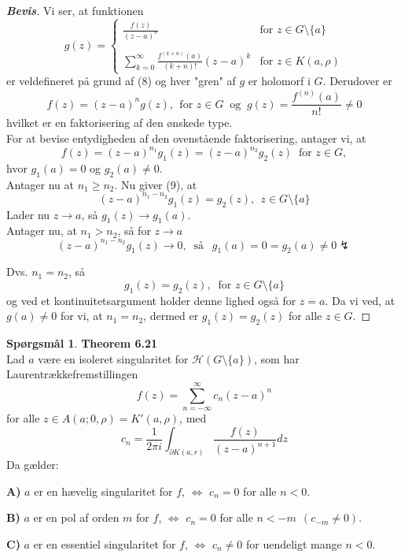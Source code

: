 \documentclass[10pt,a4paper]{article}
\theoremstyle{definition}
\newtheorem{Prob}{Spørgsmål}
\begin{document}
\begin{proof}[\textbf{Bevis}]
Vi ser, at funktionen
$$g(z) =
\left\{
	\begin{array}{ll}
		\frac{f(z)}{(z-a)^n} & \text{for } z \in G \setminus \{a\}\\ \\
		\sum\limits_{k=0}^\infty \frac{f^{(k+n)}(a)}{(k+n)!}(z-a)^k & \text{for } z \in K(a,\rho)
	\end{array}
\right.$$
er veldefineret på grund af (8) og hver "gren" af $g$ er holomorf i $G$. Derudover er
$$ f(z) = (z-a)^n g(z), \ \ \text{for } z \in G \ \text{ og } \ 
g(z) = \frac{f^{(n)}(a)}{n!} \neq 0$$
hvilket er en faktorisering af den ønskede type. \\

For at bevise entydigheden af den ovenstående faktorisering, antager vi, at
\begin{equation}
f(z) = (z-a)^{n_1} g_1(z) = (z-a)^{n_2} g_2(z) \ \text{ for } z \in G,
\end{equation}
hvor $g_1(a) = 0$ og $g_2(a) \neq 0$. \\
Antager nu at $n_1 \geq n_2$. Nu giver (9), at
$$(z-a)^{n_1 - n_2}g_1(z) = g_2(z), \ \ z \in G \setminus \{a\}$$
Lader nu $z \rightarrow a$, så $g_1(z) \rightarrow g_1(a)$. \\
Antager nu, at $n_1 > n_2$, så for $z \rightarrow a$
$$(z-a)^{n_1 - n_2} g_1(z) \rightarrow 0, \ \text{ så } \ \
g_1(a) =0 = g_2(a) \neq 0 \lightning$$

Dvs. $n_1 = n_2$, så
$$g_1(z) = g_2(z), \ \text{ for } z \in G \setminus \{a\}$$
og ved et kontinuitetsargument holder denne lighed også for $z = a$. Da vi ved, at $g(a) \neq 0$ for vi, at $n_1 = n_2$, dermed er $g_1(z) = g_2(z)$ for alle $z \in G$.
\end{proof}







\newpage
\begin{Prob}{\textbf{Theorem 6.21}} \\

Lad $a$ være en isoleret singularitet for $\mathcal{H}(G \setminus \{a\})$, som har Laurentrækkefremstillingen
$$ f(z) = \sum\limits_{n= - \infty}^\infty c_n (z-a)^n$$
for alle $z \in A(a;0,\rho) = K'(a,\rho)$, med
$$c_n = \frac{1}{2 \pi i} \int_{\partial K(a,r)} \frac{f(z)}{(z-a)^{n+1}}dz$$
Da gælder:
\item[\textbf{A)}] $a$ er en hævelig singularitet for $f$, $\Leftrightarrow$ $c_n=0$ for alle $n<0$.
\item[\textbf{B)}] $a$ er en pol af orden $m$ for $f$, $\Leftrightarrow$ $c_n=0$ for alle $n < -m \ \ (c_{-m} \neq 0)$.
\item[\textbf{C)}] $a$ er en essentiel singularitet for $f$, $\Leftrightarrow$ $c_n \neq 0$ for uendeligt mange $n<0$.
\end{Prob}
\end{document}

